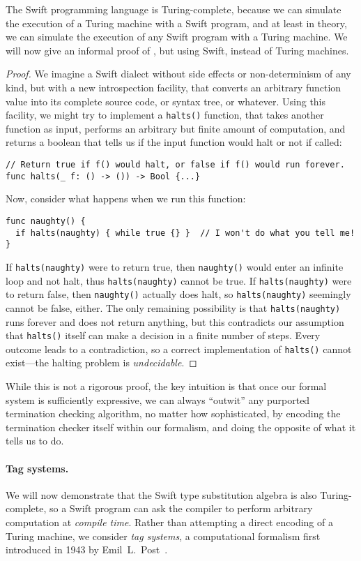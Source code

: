 \documentclass[../generics]{subfiles}
\begin{document}
The Swift programming language is Turing-complete, because we can simulate the execution of a Turing machine with a Swift program, and at least in theory, we can simulate the execution of any Swift program with a Turing machine. We will now give an informal proof of , but using Swift, instead of Turing machines.
\begin{proof}
We imagine a Swift dialect without side effects or non-determinism of any kind, but with a new introspection facility, that converts an arbitrary function value into its complete source code, or syntax tree, or whatever. Using this facility, we might try to implement a \texttt{halts()} function, that takes another function as input, performs an arbitrary but finite amount of computation, and returns a boolean that tells us if the input function would halt or not if called:
\begin{Verbatim}
// Return true if f() would halt, or false if f() would run forever.
func halts(_ f: () -> ()) -> Bool {...}
\end{Verbatim}
Now, consider what happens when we run this function:
\begin{Verbatim}
func naughty() {
  if halts(naughty) { while true {} }  // I won't do what you tell me!
}
\end{Verbatim}
If \texttt{halts(naughty)} were to return true, then \texttt{naughty()} would enter an infinite loop and not halt, thus \texttt{halts(naughty)} cannot be true. If \texttt{halts(naughty)} were to return false, then \texttt{naughty()} actually does halt, so \texttt{halts(naughty)} seemingly cannot be false, either. The only remaining possibility is that \texttt{halts(naughty)} runs forever and does not return anything, but this contradicts our assumption that \texttt{halts()} itself can make a decision in a finite number of steps. Every outcome leads to a contradiction, so a correct implementation of \texttt{halts()} cannot exist---the halting problem is \emph{undecidable}.
\end{proof}

While this is not a rigorous proof, the key intuition is that once our formal system is sufficiently expressive, we can always ``outwit'' any purported termination checking algorithm, no matter how sophisticated, by encoding the termination checker itself within our formalism, and doing the opposite of what it tells us to do.

\paragraph{Tag systems.} We will now demonstrate that the Swift type substitution algebra is also Turing-complete, so a Swift program can ask the compiler to perform arbitrary computation at \emph{compile time}. Rather than attempting a direct encoding of a Turing machine, we consider \emph{tag systems}, a computational formalism first introduced in 1943 by Emil~L.~Post~\cite{posttag}.
\end{document}
